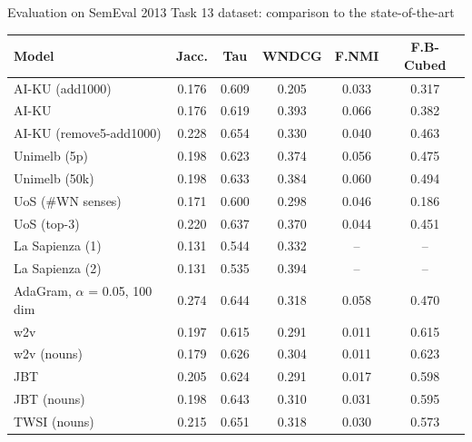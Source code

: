 \documentclass[accentcolor=tud9c,colorbacktitle,inverttitle,landscape,german,presentation]{tudbeamer}
\begin{document}
\begin{frame}{Evaluation on SemEval 2013 Task 13 dataset: comparison to the state-of-the-art}
	\vspace{-0.4cm}
	\small
	\begin{center}
		\begin{tabular}{l|ccc|cc}
			\bf Model & \bf Jacc. & \bf Tau & \bf WNDCG & \bf F.NMI & \bf F.B-Cubed \\ 
			\midrule
			
			AI-KU (add1000) & 0.176 & 0.609 & 0.205 & 0.033 & 0.317 \\
			AI-KU & 0.176 & 0.619 & 0.393 & 0.066 & 0.382 \\
			AI-KU (remove5-add1000) & 0.228 & 0.654 & 0.330 & 0.040 & 0.463 \\
			Unimelb (5p) & 0.198 & 0.623 & 0.374 & 0.056 & 0.475 \\
			Unimelb (50k) & 0.198 & 0.633 & 0.384 & 0.060 & 0.494 \\
			UoS (\#WN senses) & 0.171 & 0.600 & 0.298 & 0.046 & 0.186 \\
			UoS (top-3) & 0.220 & 0.637 & 0.370 & 0.044 & 0.451 \\
			La Sapienza (1) & 0.131 & 0.544 & 0.332 & --  & -- \\
			La Sapienza (2) & 0.131 & 0.535 & 0.394 & -- & -- \\ \midrule
			AdaGram, $\alpha$ = 0.05, 100 dim & 0.274 & 0.644  & 0.318  & 0.058  & 0.470  \\ \midrule
			\alert{w2v}  & 0.197 & 0.615 & 0.291 & 0.011 & 0.615 \\
			\alert{w2v (nouns)} & 0.179 & 0.626 & 0.304 & 0.011 & 0.623 \\
			
			\alert{JBT} & 0.205 & 0.624 & 0.291 & 0.017 & 0.598\\
			\alert{JBT (nouns)} & 0.198 & 0.643 & 0.310 & 0.031 & 0.595\\
			\alert{TWSI (nouns)} & 0.215 & 0.651 & 0.318 & 0.030 & 0.573 \\ 
				
		\end{tabular}
	\end{center}
\end{frame}
\end{document}
